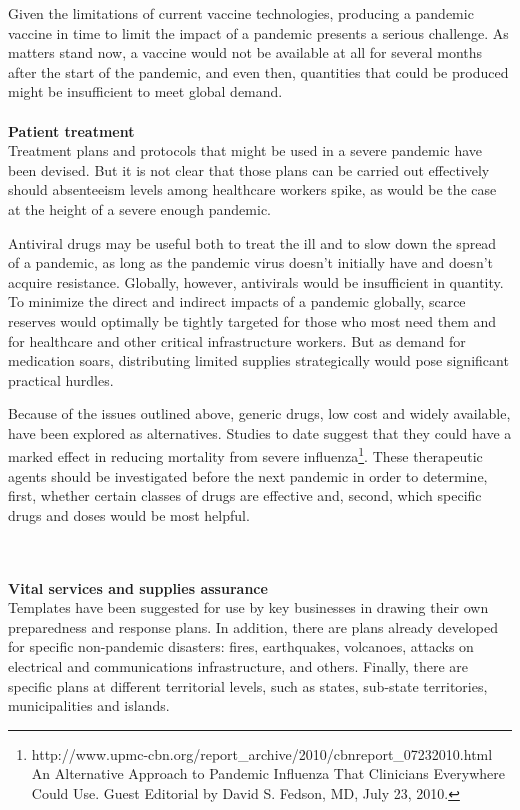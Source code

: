 \documentclass[12pt, a4]{scrartcl}
\begin{document}
Given the limitations of current vaccine technologies, producing a pandemic vaccine in time to limit the impact of a pandemic presents a serious challenge. As matters stand now, a vaccine would not be available at all for several months after the start of the pandemic, and even then, quantities that could be produced might be insufficient to meet global demand.
\\
\\
\textbf{Patient treatment}\\
Treatment plans and protocols that might be used in a severe pandemic have been devised. But it is not clear that those plans can be carried out effectively should absenteeism levels among healthcare workers spike, as would be the case at the height of a severe enough pandemic.

Antiviral drugs may be useful both to treat the ill and to slow down the spread of a pandemic, as long as the pandemic virus doesn't initially have and doesn’t acquire resistance. Globally, however, antivirals would be insufficient in quantity. To minimize the direct and indirect impacts of a pandemic globally, scarce reserves would optimally be tightly targeted for those who most need them and for healthcare and other critical infrastructure workers. But as demand for medication soars, distributing limited supplies strategically would pose significant practical hurdles.

Because of the issues outlined above, generic drugs, low cost and widely available, have been explored as alternatives. Studies to date suggest that they could have a marked effect in reducing mortality from severe influenza\footnote{http://www.upmc-cbn.org/report_archive/2010/cbnreport_07232010.html An Alternative Approach to Pandemic Influenza That Clinicians Everywhere Could Use. Guest Editorial by David S. Fedson, MD, July 23, 2010.}. These therapeutic agents should be investigated before the next pandemic in order to determine, first, whether certain classes of drugs are effective and, second, which specific drugs and doses would be most helpful.

\\
\\
\textbf{Vital services and supplies assurance}\\
Templates have been suggested for use by key businesses in drawing their own preparedness and response plans. In addition, there are plans already developed for specific non-pandemic disasters: fires, earthquakes, volcanoes, attacks on electrical and communications infrastructure, and others. Finally, there are specific plans at different territorial levels, such as states, sub-state territories, municipalities and islands.
\end{document}
